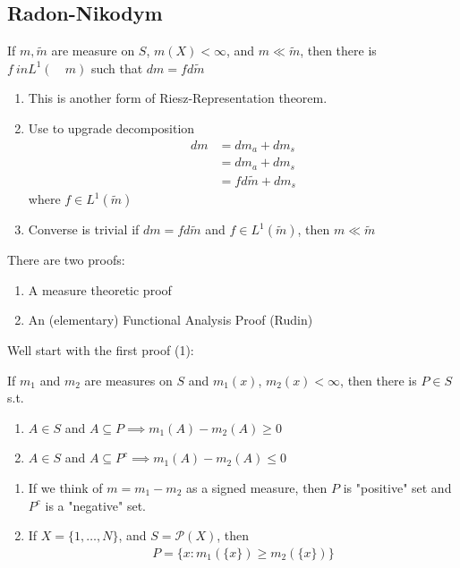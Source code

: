 \subsection{Radon-Nikodym}

\begin{theorem}
	If $m, \tilde{m}$ are measure on $S$, $m(X) < \infty$, and $m \ll \tilde{m}$, then there is $f \ in L^{1} ( \quad{m})$ such that
	$dm = f d\tilde{m}$
\end{theorem}

\begin{remark}
	\begin{enumerate}
		\item This is another form of Riesz-Representation theorem.
		\item Use to upgrade decomposition
			\begin{align*}
				dm &= dm_{a} + dm_s \\
				   &= dm_a + dm_s \\
				   &= f d\tilde{m} + d m_{s}
			\end{align*} where $f \in L^{1} (\tilde m)$
		\item Converse is trivial if $dm = f d \tilde{m}$ and
			$f \in L^1 (\tilde{m} )$, then $m \ll \tilde{m}$
	\end{enumerate}
\end{remark}

There are two proofs:
\begin{enumerate}
	\item A measure theoretic proof
	\item An (elementary) Functional Analysis Proof (Rudin)
\end{enumerate}

Well start with the first proof (1):

\begin{theorem} If $m_1$ and $m_2$ are measures on $S$ and $m_1 (x)$, $m_2 (x) < \infty$, then there is $P \in S$ s.t.
	\begin{enumerate}
		\item $A \in S$ and $A \subseteq P \implies m_1 (A) - m_2 (A) \geq 0$
		\item $A \in S$ and $A \subseteq P^c \implies m_1 (A) - m_2 (A) \leq 0$
	\end{enumerate}
\end{theorem}


\begin{remark}
	\begin{enumerate}
		\item If we think of $m = m_1 - m_2$ as a signed measure, then $P$ is "positive" set and $P^c$ is a "negative" set.
		\item If $X = \{1, \ldots, N\}$, and $S = \mathcal{P} (X)$, then
			\begin{align*}
				P = \{x : m_{1} (\{x\}) \geq m_2 (\{ x \})\}
			\end{align*}
	\end{enumerate}
\end{remark}

